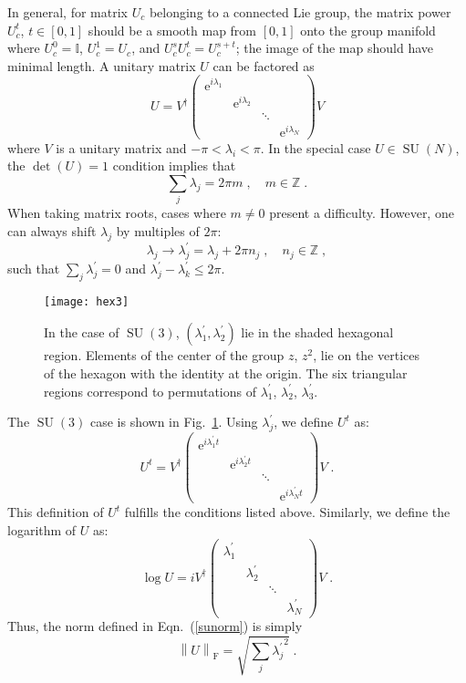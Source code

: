 \documentclass[preprint,aps,prd]{revtex4-2}
\newcommand{\da}{\dagger}  %
\newcommand{\be}{\begin{equation}}
\newcommand{\eq}{\end{equation}}
\newcommand{\integer}{\mathbb{Z}}       %
\DeclareMathOperator{\SU}{SU}
\newcommand\fnorm[1]{\left\lVert #1 \right\rVert_\mathrm{F}}
\begin{document}
In general, for matrix $U_c$ belonging to a connected Lie group,
the matrix power $U_c^t$, $t\in[0,1]$ should be a
smooth map from $[0,1]$ onto the group manifold where
$U_c^0=\mathbb{I}$, $U_c^1=U_c$, and $U_c^s U_c^t = U_c^{s+t}$;
the image of the map should have minimal length.
A unitary matrix $U$ can be factored as
%
\be
U = V^\da \begin{pmatrix}
    \mathrm{e}^{i \lambda_1} & & &\\
    & \mathrm{e}^{i \lambda_2} & &\\
    & & \ddots & \\
    & & & \mathrm{e}^{i \lambda_N}\end{pmatrix} V
\eq
%
where $V$ is a unitary matrix and $-\pi < \lambda_i < \pi$.
In the special case $U \in \SU(N)$, the $\det(U)=1$ condition implies that
\be
\sum_j \lambda_j = 2 \pi m\;, \quad m\in\integer \;.
\eq
When taking matrix roots, cases where $m\neq 0$ present a
difficulty.  However, one can always shift $\lambda_j$ by
multiples of $2\pi$:
\be
\lambda_j \to \lambda_j^\prime = \lambda_j + 2 \pi n_j\;,\quad
n_j\in\integer \; ,
\eq
such that $\sum_j \lambda_j^\prime = 0$ and
$\lambda_j^\prime - \lambda_k^\prime \le 2 \pi$.
%
\begin{figure}
\texttt{[image: hex3]}
\caption{In the case of $\SU(3)$, $(\lambda_1^\prime,\lambda_2^\prime)$
  lie in the shaded hexagonal region.
  Elements of the center of the group $z$, $z^2$, lie on the vertices
  of the hexagon with the identity at the origin.
  The six triangular regions correspond to permutations of
  $\lambda_1^\prime$, $\lambda_2^\prime$, $\lambda_3^\prime$.   \label{hexagon}}
\end{figure}
%
The $\SU(3)$ case is shown in Fig.~\ref{hexagon}.
Using $\lambda_j^\prime$, we define $U^t$ as:
\be
U^t = V^\da \begin{pmatrix}
    \mathrm{e}^{i\lambda_1^\prime t} & & &\\
    & \mathrm{e}^{i\lambda_2^\prime t} & &\\
    & & \ddots & \\
    & & & \mathrm{e}^{i\lambda_N^\prime t}\end{pmatrix} V \; .
\eq
This definition of $U^t$ fulfills the conditions listed above.
Similarly, we define the logarithm of $U$ as:
\be
\log U = i V^\da \begin{pmatrix}
    \lambda_1^\prime & & &\\
    & \lambda_2^\prime & &\\
    & & \ddots & \\
    & & & \lambda_N^\prime\end{pmatrix} V \; .
\eq
Thus, the norm defined in Eqn.~(\ref{sunorm}) is simply
\be
\fnorm{U} = \sqrt{\sum_j {\lambda_j^\prime}^2} \; .
\eq
\end{document}
